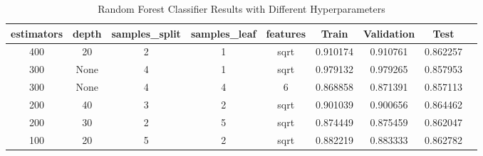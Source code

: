 \documentclass[twocolumn]{article}
\begin{document}
\onecolumn
\begin{table}[ht]
\centering
\begin{tabular}{|c|c|c|c|c|c|c|c|c|}
\hline
\textbf{\scriptsize estimators} & \textbf{\scriptsize depth} & \textbf{\scriptsize samples\_split} & \textbf{\scriptsize samples\_leaf} & \textbf{\scriptsize features} & \textbf{\scriptsize Train} & \textbf{\scriptsize Validation} & \textbf{\scriptsize Test} \\ \hline
400                    & 20                  & 2                            & 1                            & sqrt                  & 0.910174             & 0.910761                 & 0.862257            \\ \hline
300                    & None                & 4                            & 1                            & sqrt                  & 0.979132             & 0.979265                 & 0.857953            \\ \hline
300                    & None                & 4                            & 4                            & 6                     & 0.868858             & 0.871391                 & 0.857113            \\ \hline
200                    & 40                  & 3                            & 2                            & sqrt                  & 0.901039             & 0.900656                 & 0.864462            \\ \hline
200                    & 30                  & 2                            & 5                            & sqrt                  & 0.874449             & 0.875459                 & 0.862047            \\ \hline
100                    & 20                  & 5                            & 2                            & sqrt                  & 0.882219             & 0.883333                 & 0.862782            \\ \hline
\end{tabular}
\caption{Random Forest Classifier Results with Different Hyperparameters}
\label{tab:rf_results}
\end{table}

\vfil
\twocolumn
\end{document}
